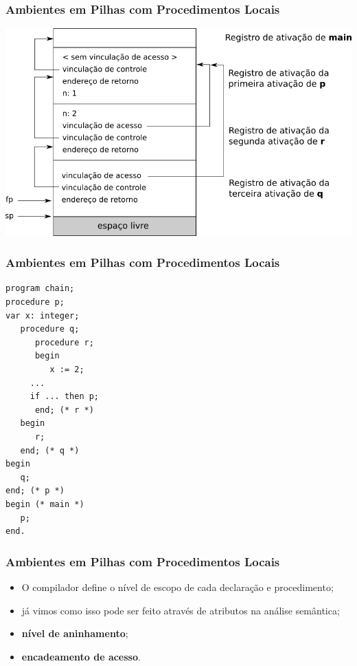 \documentclass[table]{beamer}
\begin{document}
\begin{frame}
   \frametitle{Ambientes em Pilhas com Procedimentos Locais}
   \includegraphics[width=\linewidth,height=\textheight,keepaspectratio]{figuras/procedimentoslocais02.png}
\end{frame}

\begin{frame}[fragile]
   \frametitle{Ambientes em Pilhas com Procedimentos Locais}
   \small
   \begin{verbatim}
program chain;
procedure p;
var x: integer;
   procedure q;
      procedure r;
      begin
         x := 2;
	 ...
	 if ... then p;
      end; (* r *)
   begin
      r;
   end; (* q *)
begin
   q;
end; (* p *)
begin (* main *)
   p;
end.
   \end{verbatim}
\end{frame}

\begin{frame}
   \frametitle{Ambientes em Pilhas com Procedimentos Locais}
   \begin{itemize}
      \item O compilador define o nível de escopo de cada declaração e procedimento;
      \item já vimos como isso pode ser feito através de atributos na análise semântica;
      \item \textbf{nível de aninhamento};
      \item \textbf{encadeamento de acesso}.
   \end{itemize}
\end{frame}
\end{document}

